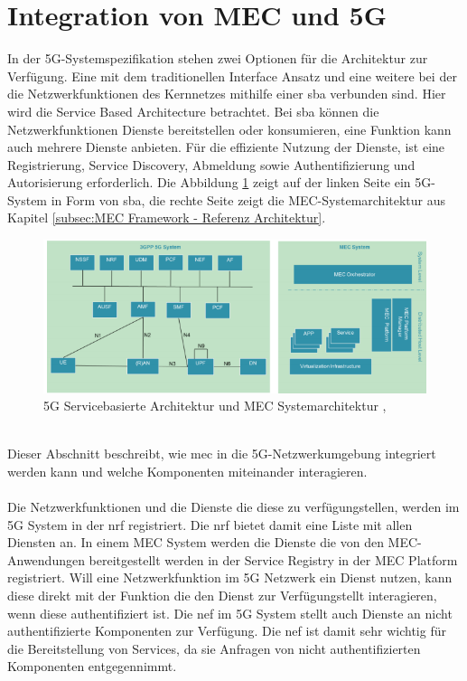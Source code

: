 \documentclass[runningheads]{llncs}
\numberwithin{figure}{section}
\begin{document}
\section{Integration von MEC und 5G}
In der 5G-Systemspezifikation stehen zwei Optionen für die Architektur zur Verfügung. 
Eine mit dem traditionellen Interface Ansatz und eine weitere 
bei der die Netzwerkfunktionen des Kernnetzes mithilfe einer \acrfull{sba} verbunden sind. 
Hier wird die Service Based Architecture betrachtet. Bei \acrshort{sba} können die Netzwerkfunktionen Dienste bereitstellen oder konsumieren, eine
Funktion kann auch mehrere Dienste anbieten. 
Für die effiziente Nutzung der Dienste, 
ist eine Registrierung, Service Discovery, Abmeldung sowie Authentifizierung und Autorisierung erforderlich.
Die Abbildung \ref{fig:sba} zeigt auf der linken Seite ein 5G-System in Form von \acrshort{sba}, 
die rechte Seite zeigt die MEC-Systemarchitektur aus Kapitel \ref{subsec:MEC Framework - Referenz Architektur}.
\begin{figure}
  \includegraphics[width=\linewidth]{images/5GMEC-System-Architecture.png}
  \caption{5G Servicebasierte Architektur und MEC Systemarchitektur \cite{arnold5GRadioAccess2017} \cite{etsiETSIGSMEC}, \cite{etsiMultiaccessEdgeComputinga}}
  \label{fig:sba}
\end{figure}
\\
Dieser Abschnitt beschreibt, wie \acrfull{mec} in die 5G-Netzwerkumgebung integriert werden kann 
und welche Komponenten miteinander interagieren.
\\
\\
Die Netzwerkfunktionen und die Dienste die diese zu verfügungstellen, werden im 5G System in der \acrfull{nrf} registriert.
Die \acrshort{nrf} bietet damit eine Liste mit allen Diensten an. 
In einem MEC System werden die Dienste die von den MEC- Anwendungen bereitgestellt werden in der Service Registry in der MEC Platform registriert.
Will eine Netzwerkfunktion im 5G Netzwerk ein Dienst nutzen, kann diese direkt mit der Funktion die den Dienst zur Verfügungstellt interagieren,
wenn diese au­then­ti­fi­zie­rt ist. Die \acrfull{nef} im 5G System stellt auch Dienste an nicht au­then­ti­fi­zie­rte Komponenten 
zur Verfügung. Die \acrshort{nef} ist damit sehr wichtig für die Bereitstellung von Services, da sie Anfragen von nicht authentifizierten Komponenten
entgegennimmt.
\\
\\
\end{document}
